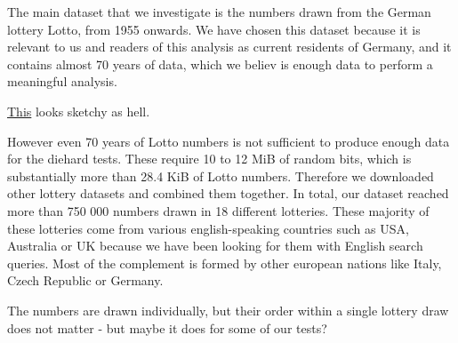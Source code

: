 The main dataset that we investigate is the numbers drawn from the German lottery Lotto, from 1955 onwards. 
We have chosen this dataset because it is relevant to us and readers of this analysis as current residents of Germany, 
and it contains almost 70 years of data, which we believ is enough data to perform a meaningful analysis.


 \href{https://notebook.community/JesseScott/Lotto649/lotto}{This} looks sketchy as hell.

However even 70 years of Lotto numbers is not sufficient to produce enough data for the diehard tests. These require 10 to 12 MiB of random bits, which is
substantially more than 28.4 KiB of Lotto numbers. Therefore we downloaded other lottery datasets and combined them together. In total, our dataset reached
more than 750 000 numbers drawn in 18 different lotteries. These majority of these lotteries come from various english-speaking countries such as USA,
Australia or UK because we have been looking for them with English search queries. Most of the complement is formed by other european nations like Italy,
Czech Republic or Germany.


The numbers are drawn individually, but their order within a single lottery draw does not matter - but maybe it does for some of our tests?

